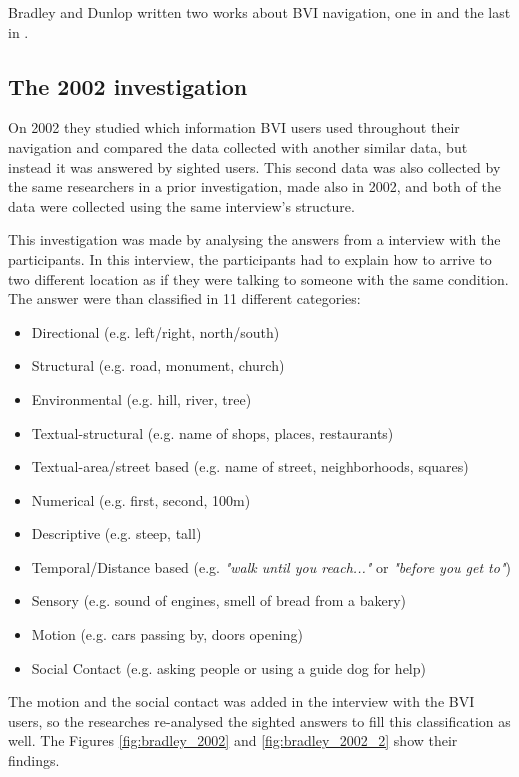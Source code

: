 Bradley and Dunlop written two works about BVI navigation, one in \citeyear{bradley2002investigating} and the last in \citeyear{bradley2005experimental}. 

\subsection{The 2002 investigation}

On 2002 they studied which information BVI users used throughout their navigation and compared the data collected with another similar data, but instead it was answered by sighted users. This second data was also collected by the same researchers in a prior investigation, made also in 2002, and both of the data were collected using the same interview's structure.

This investigation was made by analysing the answers from a interview with the participants. In this interview, the participants had to explain how to arrive to two different location as if they were talking to someone with the same condition. The answer were than classified in 11 different categories:

\begin{itemize}
    \item Directional (e.g. left/right, north/south)
    \item Structural (e.g. road, monument, church)
    \item Environmental (e.g. hill, river, tree)
    \item Textual-structural (e.g. name of shops, places, restaurants)
    \item Textual-area/street based (e.g. name of street, neighborhoods, squares)
    \item Numerical (e.g. first, second, 100m)
    \item Descriptive (e.g. steep, tall)
    \item Temporal/Distance based (e.g. \textit{"walk until you reach..."} or \textit{"before you get to"})
    \item Sensory (e.g. sound of engines, smell of bread from a bakery)
    \item Motion (e.g. cars passing by, doors opening)
    \item Social Contact (e.g. asking people or using a guide dog for help)
\end{itemize}

The motion and the social contact was added in the interview with the BVI users, so the researches re-analysed the sighted answers to fill this classification as well. The Figures \ref{fig:bradley_2002} and \ref{fig:bradley_2002_2} show their findings.

